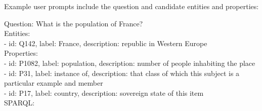 





Example user prompts include the question and candidate entities and properties:

\begin{tcolorbox}[title=SPARQL Generation User Prompt, colback=green!5!white, colframe=green!75!black, boxrule=0.5mm, arc=2mm, fontupper=\ttfamily\small, breakable]
Question: What is the population of France? \\
Entities: \\
- id: Q142, label: France, description: republic in Western Europe \\
Properties: \\
- id: P1082, label: population, description: number of people inhabiting the place \\
- id: P31, label: instance of, description: that class of which this subject is a particular example and member \\
- id: P17, label: country, description: sovereign state of this item \\
SPARQL: \\
\end{tcolorbox}

